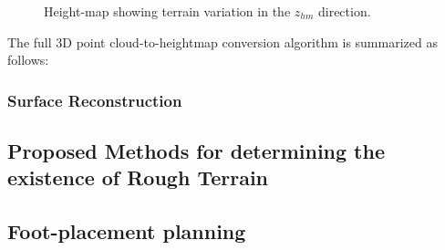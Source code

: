 				\begin{figure}[h!]
					\centering
					\caption{Height-map showing terrain variation in the $z_{hm}$ direction.}
					\label{fig::heightmap_terrain_patch_ortho}
				\end{figure}							
			
			The full 3D point cloud-to-heightmap conversion algorithm is summarized as follows:


			\subsubsection{Surface Reconstruction}


		\subsection{Proposed Methods for determining the existence of Rough Terrain}

		\subsection{Foot-placement planning}


